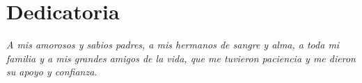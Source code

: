 \chapter*{Dedicatoria}
\begin{flushright}
	\textit{A mis amorosos y sabios padres, a mis hermanos de sangre y alma, a toda mi familia y a mis grandes amigos de la vida, que me tuvieron paciencia y me dieron su apoyo y confianza.}
\end{flushright}